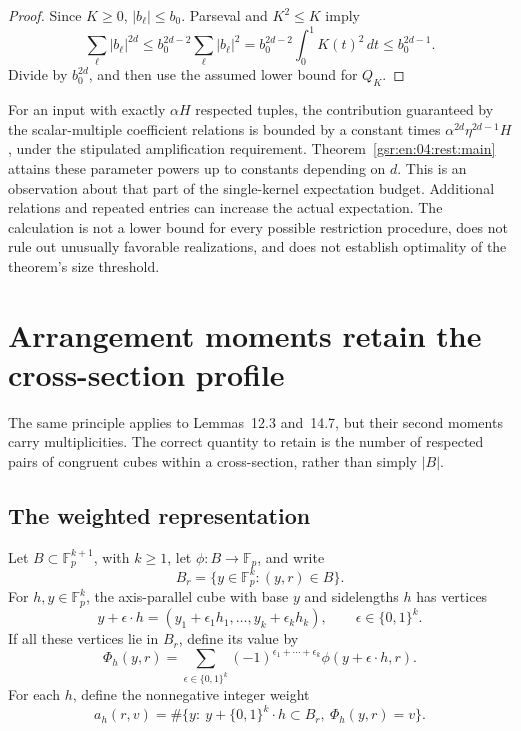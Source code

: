 \documentclass[11pt,letterpaper]{article}
\numberwithin{equation}{section}
\theoremstyle{definition}
\theoremstyle{remark}
\newcommand{\F}{\mathbb F}
\newcommand{\1}{\mathbf 1}
\newcommand{\abs}[1]{\left|#1\right|}
\newcommand{\srctag}[1]{\texorpdfstring{\enspace\textup{[#1]}}{ [#1]}}
\newcommand{\srcnote}[2]{\par\noindent{\small\textit{Source #1, delivered #2.}}\par}
\begin{document}
\begin{proof}
Since \(K\geq0\), \(\abs{b_\ell}\leq b_0\).  Parseval and
\(K^2\leq K\) imply
\[
 \sum_\ell\abs{b_\ell}^{2d}
 \leq b_0^{2d-2}\sum_\ell\abs{b_\ell}^2
 =b_0^{2d-2}\int_0^1K(t)^2\,dt
 \leq b_0^{2d-1}.
\]
Divide by \(b_0^{2d}\), and then use the assumed lower bound
for \(Q_K\).
\end{proof}

For an input with exactly \(\alpha H\) respected tuples, the
contribution guaranteed by the scalar-multiple coefficient
relations is bounded by a constant times
\(\alpha^{2d}\eta^{2d-1}H\), under the stipulated amplification
requirement.  Theorem~\ref{gsr:en:04:rest:main} attains these parameter
powers up to constants depending on \(d\).
This is an observation about that part of the single-kernel
expectation budget.  Additional relations and repeated entries
can increase the actual expectation.  The calculation is not
a lower bound for every possible restriction procedure, does
not rule out unusually favorable realizations, and does not
establish optimality of the theorem's size threshold.

\section[{Arrangement moments retain the cross-section profile\srctag{04}}]{Arrangement moments retain the cross-section profile}\label{gsr:en:04:sec:d5}
\srcnote{04}{Section 5}
\label{gsr:en:04:mom:arrangement-section}

The same principle applies to Lemmas~12.3 and~14.7, but their
second moments carry multiplicities.  The correct quantity to
retain is the number of respected pairs of congruent cubes
within a cross-section, rather than simply \(\abs B\).

\subsection{The weighted representation}

Let \(B\subset\F_p^{k+1}\), with \(k\geq1\), let
\(\phi:B\to\F_p\), and write
\[
 B_r=\{y\in\F_p^k:(y,r)\in B\}.
\]
For \(h,y\in\F_p^k\), the axis-parallel cube with base \(y\)
and sidelengths \(h\) has vertices
\[
 y+\epsilon\cdot h
   =(y_1+\epsilon_1h_1,\ldots,y_k+\epsilon_kh_k),
 \qquad \epsilon\in\{0,1\}^k.
\]
If all these vertices lie in \(B_r\), define its value by
\[
 \Phi_h(y,r)=
 \sum_{\epsilon\in\{0,1\}^k}
       (-1)^{\epsilon_1+\cdots+\epsilon_k}
       \phi(y+\epsilon\cdot h,r).
 \tag{A1}
\]
For each \(h\), define the nonnegative integer weight
\[
 a_h(r,v)=
 \#\{y:\ y+\{0,1\}^k\cdot h\subset B_r,\
                         \Phi_h(y,r)=v\}.
 \tag{A2}
\]
\end{document}
